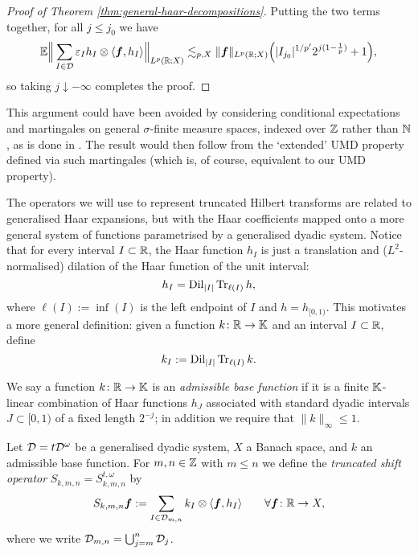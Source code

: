 \begin{proof}[Proof of Theorem \ref{thm:general-haar-decompositions}]
  Putting the two terms together, for all $j \leq j_{0}$ we have
  \begin{equation*}
    \mathbb{E} \Big\| \sum_{I \in \mathcal{D}} \varepsilon_{I} h_{I} \otimes \langle \bm{f}, h_{I} \rangle \Big\|_{L^p(\mathbb{R};X)}
    \lesssim_{p,X}  \|\bm{f}\|_{L^p(\mathbb{R};X)} \Big(|I_{j_{0}}|^{1/p'}  2^{j(1 - \frac{1}{p})} + 1\Big),
  \end{equation*}
  so taking $j \downarrow -\infty$ completes the proof.
\end{proof}

\begin{rmk}
  This argument could have been avoided by considering conditional expectations and martingales on general $\sigma$-finite measure spaces, indexed over $\mathbb{Z}$ rather than $\mathbb{N}$, as is done in \cite{HNVW16}.
  The result would then follow from the `extended' UMD property defined via such martingales (which is, of course, equivalent to our UMD property).
\end{rmk}

The operators we will use to represent truncated Hilbert transforms are related to generalised Haar expansions, but with the Haar coefficients mapped onto a more general system of functions parametrised by a generalised dyadic system.
Notice that for every interval $I \subset \mathbb{R}$, the Haar function $h_{I}$ is just a translation and ($L^2$-normalised) dilation of the Haar function of the unit interval:
\begin{equation*}
  h_{I} = \operatorname{Dil}_{|I|} \operatorname{Tr}_{\ell(I)} h,
\end{equation*}
where $\ell(I) := \inf(I)$ is the left endpoint of $I$ and $h = h_{[0,1)}$.
This motivates a more general definition: given a function $k \colon \mathbb{R} \rightarrow \mathbb{K}$ and an interval $I \subset \mathbb{R}$, define
\begin{equation*}
  k_{I} := \operatorname{Dil}_{|I|} \operatorname{Tr}_{\ell(I)} k.
\end{equation*}

\begin{defn}
  We say a function $k \colon \mathbb{R} \rightarrow \mathbb{K}$ is an \emph{admissible base function} if it is a finite $\mathbb{K}$-linear combination of Haar functions $h_{J}$ associated with standard dyadic intervals $J \subset [0,1)$ of a fixed length $2^{-j}$; in addition we require that $\|k\|_{\infty} \leq 1$.
\end{defn}

\begin{defn}
  Let $\mathcal{D} = t\mathcal{D}^{\omega}$ be a generalised dyadic system, $X$ a Banach space, and $k$ an admissible base function.
  For $m,n \in \mathbb{Z}$ with $m \leq n$ we define the \emph{truncated shift operator} $S_{k,m,n} = S_{k,m,n}^{t,\omega}$ by
  \begin{equation*}
    S_{k,m,n} \bm{f} := \sum_{I \in \mathcal{D}_{m,n}} k_{I} \otimes \langle \bm{f}, h_{I} \rangle \qquad \forall \bm{f} \colon \mathbb{R} \rightarrow X,
  \end{equation*}
  where we write $\mathcal{D}_{m,n} = \bigcup_{j = m}^{n} \mathcal{D}_{j}$.
\end{defn}

